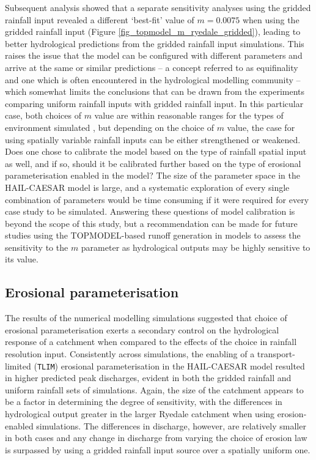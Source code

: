 Subsequent analysis showed that a separate sensitivity analyses using the gridded rainfall input revealed a different `best-fit' value of \(m=0.0075\) when using the gridded rainfall input (Figure \ref{fig_topmodel_m_ryedale_gridded}), leading to better hydrological predictions from the gridded rainfall input simulations. This raises the issue that the model can be configured with different parameters and arrive at the same or similar predictions -- a concept referred to as equifinality and one which is often encountered in the hydrological modelling community \citep{beven1993prophecy,beven2001equifinality,ebel2006physics} -- which somewhat limits the conclusions that can be drawn from the experiments comparing uniform rainfall inputs with gridded rainfall input. In this particular case, both choices of \(m\) value are within reasonable ranges for the types of environment simulated \citep{beven1984testing}, but depending on the choice of \(m\) value, the case for using spatially variable rainfall inputs can be either strengthened or weakened. Does one chose to calibrate the model based on the type of rainfall spatial input as well, and if so, should it be calibrated further based on the type of erosional parameterisation enabled in the model? The size of the parameter space in the HAIL-CAESAR model is large, and a systematic exploration of every single combination of parameters would be time consuming if it were required for every case study to be simulated. Answering these questions of model calibration is beyond the scope of this study, but a recommendation can be made for future studies using the TOPMODEL-based runoff generation in models to assess the sensitivity to the \(m\) parameter as hydrological outputs may be highly sensitive to its value.

\subsection{Erosional parameterisation}
The results of the numerical modelling simulations suggested that choice of erosional parameterisation exerts a secondary control on the hydrological response of a catchment when compared to the effects of the choice in rainfall resolution input. Consistently across simulations, the enabling of a transport-limited (\texttt{TLIM}) erosional parameterisation in the HAIL-CAESAR model resulted in higher predicted peak discharges, evident in both the gridded rainfall and uniform rainfall sets of simulations. Again, the size of the catchment appears to be a factor in determining the degree of sensitivity, with the differences in hydrological output greater in the larger Ryedale catchment when using erosion-enabled simulations. The differences in discharge, however, are relatively smaller in both cases and any change in discharge from varying the choice of erosion law is surpassed by using a gridded rainfall input source over a spatially uniform one.

